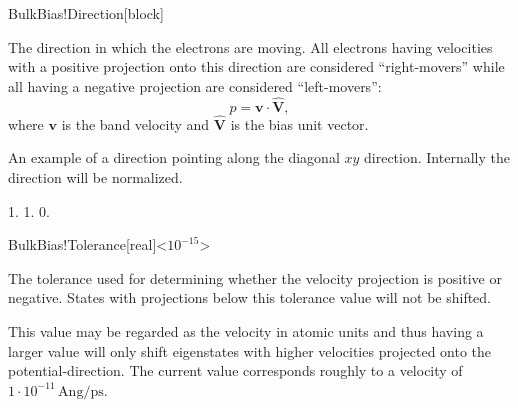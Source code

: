   \begin{fdfentry}{BulkBias!Direction}[block]
  
    The direction in which the electrons are moving. All electrons having
    velocities with a positive projection onto this direction are
    considered ``right-movers'' while all having a negative projection
    are considered ``left-movers'':
    \begin{equation}
      \label{eq:bulk-bias:projection}
      p = \mathbf v \cdot \hat{\mathbf V},
    \end{equation}
    where $\mathbf v$ is the band velocity and $\hat{\mathbf V}$ is the
    bias unit vector.
  
    An example of a direction pointing along the diagonal $xy$
    direction. Internally the direction will be normalized.
    \begin{fdfexample}
        1. 1. 0.
    \end{fdfexample}
  
  \end{fdfentry}
  
  \begin{fdfentry}{BulkBias!Tolerance}[real]<$10^{-15}$>
  
    The tolerance used for determining whether the velocity projection
    is positive or negative. States with projections below this tolerance
    value will not be shifted.
  
    This value may be regarded as the velocity in atomic units and thus
    having a larger value will only shift eigenstates with higher
    velocities projected onto the potential-direction. The current value
    corresponds roughly to a velocity of
    $1\cdot10^{-11}\,\mathrm{Ang}/\mathrm{ps}$.
  
  \end{fdfentry}
  
